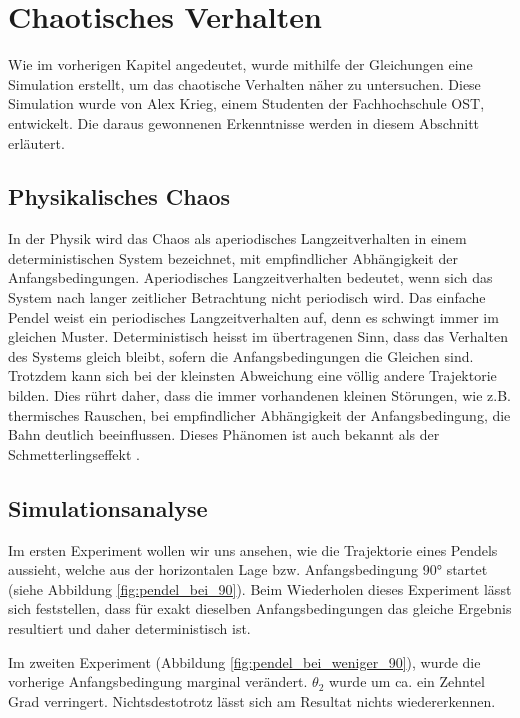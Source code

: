 \section{Chaotisches Verhalten}
Wie im vorherigen Kapitel angedeutet, wurde mithilfe der Gleichungen eine Simulation erstellt,
um das chaotische Verhalten näher zu untersuchen.
Diese Simulation wurde von Alex Krieg, einem Studenten der Fachhochschule OST, entwickelt.
Die daraus gewonnenen Erkenntnisse werden in diesem Abschnitt erläutert.

\subsection{Physikalisches Chaos}
In der Physik wird das Chaos als aperiodisches Langzeitverhalten in einem deterministischen
System bezeichnet, mit empfindlicher Abhängigkeit der Anfangsbedingungen.
Aperiodisches Langzeitverhalten bedeutet, wenn sich das System nach langer zeitlicher Betrachtung
nicht periodisch wird.
Das einfache Pendel weist ein periodisches Langzeitverhalten auf,
denn es schwingt immer im gleichen Muster.
Deterministisch heisst im übertragenen Sinn, dass das Verhalten des Systems gleich bleibt,
sofern die Anfangsbedingungen die Gleichen sind.
Trotzdem kann sich bei der kleinsten Abweichung eine völlig andere Trajektorie bilden.
Dies rührt daher, dass die immer vorhandenen kleinen Störungen, wie z.B. thermisches Rauschen,
bei empfindlicher Abhängigkeit der Anfangsbedingung, die Bahn deutlich beeinflussen.
Dieses Phänomen ist auch bekannt als der Schmetterlingseffekt \cite{doppelpendel:schmetterlingseffekt}.

\subsection{Simulationsanalyse}
Im ersten Experiment wollen wir uns ansehen, wie die Trajektorie eines Pendels aussieht,
welche aus der horizontalen Lage bzw. Anfangsbedingung 90° startet
(siehe Abbildung \ref{fig:pendel_bei_90}).
Beim Wiederholen dieses Experiment lässt sich feststellen, dass für exakt dieselben Anfangsbedingungen
das gleiche Ergebnis resultiert und daher deterministisch ist.

Im zweiten Experiment (Abbildung \ref{fig:pendel_bei_weniger_90}), wurde die vorherige
Anfangsbedingung marginal verändert.
\(\theta_2\) wurde um ca. ein Zehntel Grad verringert.
Nichtsdestotrotz lässt sich am Resultat nichts wiedererkennen.

